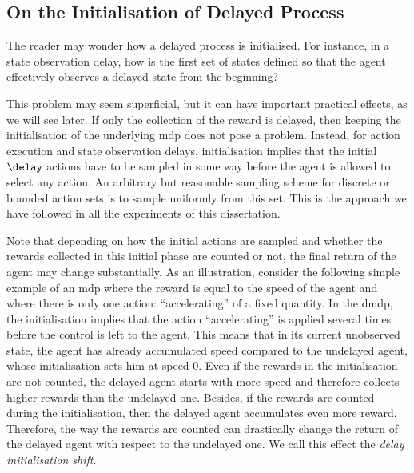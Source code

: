 \subsection{On the Initialisation of Delayed Process}
\label{subsec:delay_init}
The reader may wonder how a delayed process is initialised.
For instance, in a state observation delay, how is the first set of states defined so that the agent effectively observes a delayed state from the beginning? 

This problem may seem superficial, but it can have important practical effects, as we will see later. 
If only the collection of the reward is delayed, then keeping the initialisation of the underlying \gls{mdp} does not pose a problem. 
Instead, for action execution and state observation delays, initialisation implies that the initial $\delay$ actions have to be sampled in some way before the agent is allowed to select any action. 
An arbitrary but reasonable sampling scheme for discrete or bounded action sets is to sample uniformly from this set. 
This is the approach we have followed in all the experiments of this dissertation. 

Note that depending on how the initial actions are sampled and whether the rewards collected in this initial phase are counted or not, the final return of the agent may change substantially.
As an illustration, consider the following simple example of an \gls{mdp} where the reward is equal to the speed of the agent and where there is only one action: ``accelerating'' of a fixed quantity. 
In the \gls{dmdp}, the initialisation implies that the action ``accelerating'' is applied several times before the control is left to the agent.
This means that in its current unobserved state, the agent has already accumulated speed compared to the undelayed agent, whose initialisation sets him at speed 0.
Even if the rewards in the initialisation are not counted, the delayed agent starts with more speed and therefore collects higher rewards than the undelayed one.
Besides, if the rewards are counted during the initialisation, then the delayed agent accumulates even more reward.
Therefore, the way the rewards are counted can drastically change the return of the delayed agent with respect to the undelayed one.
We call this effect the \emph{delay initialisation shift}.



